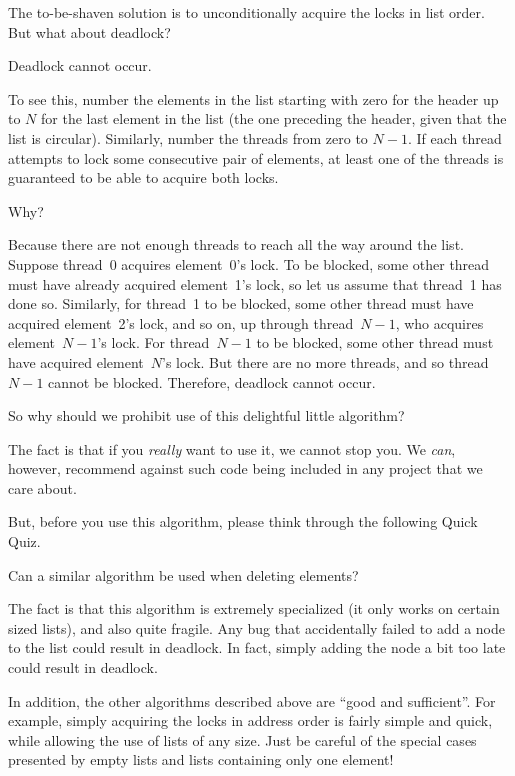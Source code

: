 The to-be-shaven solution is to unconditionally acquire the locks in
list order.
But what about deadlock?

Deadlock cannot occur.

To see this, number the elements in the list starting with zero for the
header up to $N$ for the last element in the list (the one preceding the
header, given that the list is circular).
Similarly, number the threads from zero to $N-1$.
If each thread attempts to lock some consecutive pair of elements,
at least one of the threads is guaranteed to be able to acquire both
locks.

Why?

Because there are not enough threads to reach all the way around the list.
Suppose thread~0 acquires element~0's lock.
To be blocked, some other thread must have already acquired element~1's
lock, so let us assume that thread~1 has done so.
Similarly, for thread~1 to be blocked, some other thread must have acquired
element~2's lock, and so on, up through thread~$N-1$, who acquires
element~$N-1$'s lock.
For thread~$N-1$ to be blocked, some other thread must have acquired
element~$N$'s lock.
But there are no more threads, and so thread~$N-1$ cannot be blocked.
Therefore, deadlock cannot occur.

So why should we prohibit use of this delightful little algorithm?

The fact is that if you \emph{really} want to use it, we cannot stop you.
We \emph{can}, however, recommend against such code being included
in any project that we care about.

But, before you use this algorithm, please think through the following
Quick Quiz.

\QuickQuiz{}
	Can a similar algorithm be used when deleting elements?
 \QuickQuizEnd

The fact is that this algorithm is extremely specialized (it only works
on certain sized lists), and also quite fragile.
Any bug that accidentally failed to add a node to the list could result
in deadlock.
In fact, simply adding the node a bit too late could result in deadlock.

In addition, the other algorithms described above are ``good and sufficient''.
For example, simply acquiring the locks in address order is fairly simple
and quick, while allowing the use of lists of any size.
Just be careful of the special cases presented by empty lists and lists
containing only one element!


